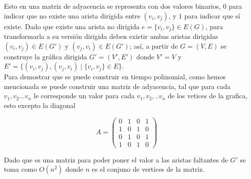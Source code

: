 Esto en una matriz de adyacencia se representa con dos valores binarios, $0$ para indicar que no existe una arista dirigida entre $(v_i, v_j)$, y $1$ para indicar que sí existe. Dado que existe una arista no dirigida $e = \{v_i, v_j\} \in E(G)$, para transformarla a su versión dirigida deben existir ambas aristas dirigidas $(v_i, v_j) \in E(G')$ y $(v_j, v_i) \in E(G')$; así, a partir de $G = (V, E)$ se construye la gráfica dirigida $G' = (V', E')$ donde $V' = V$ y $E' = \{ (v_i, v_j), (v_j, v_i) \mid \{v_i, v_j\} \in E \}$.\\

Para demostrar que se puede construir en tiempo polinomial, como hemos mencionada se puede construir una matriz de adyacencia, tal que para cada $v_1,v_2...v_n$ le corresponde un valor para cada $v_1,v_2,..v_n$ de los vetices de la grafica, esto excepto la diagonal

$$A = \begin{pmatrix} 0 & 1 & 0 & 1 \\ 1 & 0 & 1 & 0 \\ 0 & 1 & 0 & 1 \\ 1 & 0 & 1 & 0 \end{pmatrix}$$

Dado que es una matriz para poder poner el valor a las aristas faltantes de $G'$ se toma como $O(n^2)$ donde $n$ es el conjuno de vertices de la matriz.\\

